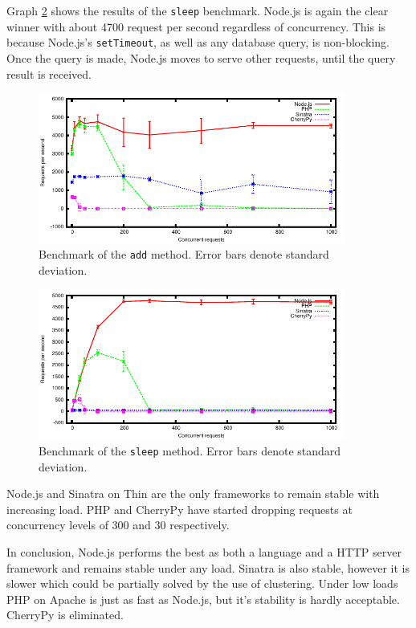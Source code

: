 \documentclass[12pt,oneside]{fithesis}
\begin{document}
		Graph \ref{fig:bench_sleep} shows the results of the \texttt{sleep} benchmark. Node.js is again the clear winner with about 4700 request per second regardless of concurrency. This is because Node.js's \texttt{setTimeout}, as well as any database query, is non-blocking. Once the query is made, Node.js moves to serve other requests, until the query result is received.
		
		\begin{figure}[h!]
	  \centering
	    \includegraphics[width=0.9\textwidth]{plot_add.pdf}
		  \caption{Benchmark of the \texttt{add} method. Error bars denote standard deviation.}
		  \label{fig:bench_add}
		\end{figure}		
		\begin{figure}[h!]
	  \centering
	    \includegraphics[width=0.9\textwidth]{plot_sleep.pdf}
		  \caption{Benchmark of the \texttt{sleep} method. Error bars denote standard deviation.}
		  \label{fig:bench_sleep}
		\end{figure}
		
		Node.js and Sinatra on Thin are the only frameworks to remain stable with increasing load. PHP and CherryPy have started dropping requests at concurrency levels of 300 and 30 respectively.
				
		In conclusion, Node.js performs the best as both a language and a HTTP server framework and remains stable under any load. Sinatra is also stable, however it is slower which could be partially solved by the use of clustering. Under low loads PHP on Apache is just as fast as Node.js, but it's stability is hardly acceptable. CherryPy is eliminated.
		
\end{document}
